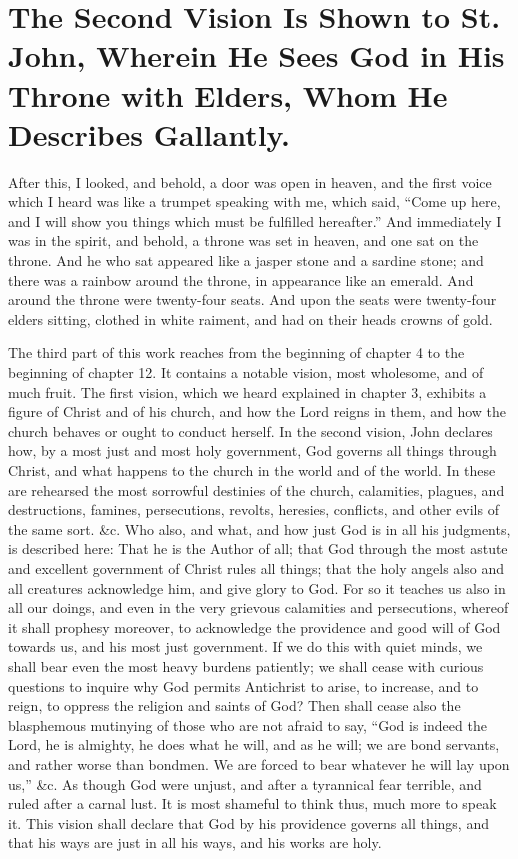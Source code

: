 \chapter[Sermon 23. The Second Vision Is Shown to St. John, Wherein He Sees God in His Throne with Elders, Whom He Describes Gallantly.]{The Second Vision Is Shown to St. John, Wherein He Sees God in His Throne with Elders, Whom He Describes Gallantly.}
\label{sermon:023}

After this, I looked, and behold, a door was open in heaven, and the first voice which I heard was like a trumpet speaking with me, which said, “Come up here, and I will show you things which must be fulfilled hereafter.” And immediately I was in the spirit, and behold, a throne was set in heaven, and one sat on the throne. And he who sat appeared like a jasper stone and a sardine stone; and there was a rainbow around the throne, in appearance like an emerald. And around the throne were twenty-four seats. And upon the seats were twenty-four elders sitting, clothed in white raiment, and had on their heads crowns of gold.

The third part of this work reaches from the beginning of chapter 4 to the beginning of chapter 12. It contains a notable vision, most wholesome, and of much fruit. The first vision, which we heard explained in chapter 3, exhibits a figure of Christ and of his church, and how the Lord reigns in them, and how the church behaves or ought to conduct herself. In the second vision, John declares how, by a most just and most holy government, God governs all things through Christ, and what happens to the church in the world and of the world. In these are rehearsed the most sorrowful destinies of the church, calamities, plagues, and destructions, famines, persecutions, revolts, heresies, conflicts, and other evils of the same sort. \&c. Who also, and what, and how just God is in all his judgments, is described here: That he is the Author of all; that God through the most astute and excellent government of Christ rules all things; that the holy angels also and all creatures acknowledge him, and give glory to God. For so it teaches us also in all our doings, and even in the very grievous calamities and persecutions, whereof it shall prophesy moreover, to acknowledge the providence and good will of God towards us, and his most just government. If we do this with quiet minds, we shall bear even the most heavy burdens patiently; we shall cease with curious questions to inquire why God permits Antichrist to arise, to increase, and to reign, to oppress the religion and saints of God? Then shall cease also the blasphemous mutinying of those who are not afraid to say, “God is indeed the Lord, he is almighty, he does what he will, and as he will; we are bond servants, and rather worse than bondmen. We are forced to bear whatever he will lay upon us,” \&c. As though God were unjust, and after a tyrannical fear terrible, and ruled after a carnal lust. It is most shameful to think thus, much more to speak it. This vision shall declare that God by his providence governs all things, and that his ways are just in all his ways, and his works are holy.

